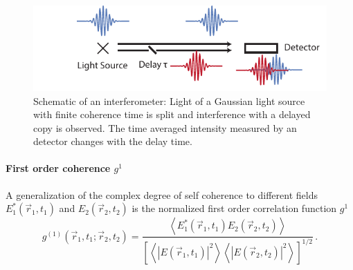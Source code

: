  \begin{figure}
	\centering
	\includegraphics[width=0.8\linewidth]{images/michelson.pdf}
	\caption[Schematic of an interferometer]{Schematic of an interferometer: Light of a Gaussian light source with finite coherence time is split and interference with a delayed copy is observed. The time averaged intensity measured by an detector changes with the delay time. }
	\label{fig:michelson}
\end{figure}


\paragraph{First order coherence $g^1$}
A generalization of the complex degree of self coherence to different fields  $E_1^*(\vec{r}_1,t_1)$ and $E_2(\vec{r}_2,t_2)$ is the normalized first order correlation function $g^1$ \cite{agarwal2013}
\begin{equation}
	g^{(1)}(\vec{r}_1,t_1;\vec{r}_2,t_2)= \frac
	{\left< E_1^*(\vec{r}_1,t_1)E_2(\vec{r}_2,t_2) \right>}
	{\left[ \left<\left | E(\vec{r}_1,t_1)\right |^2 \right> \left< \left |E(\vec{r}_2,t_2)\right |^2 \right>\right]^{1/2}}	\,.
\end{equation}



